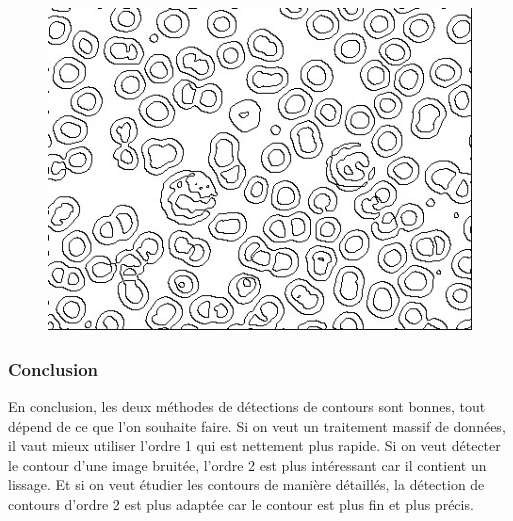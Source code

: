 \documentclass[paper=a4, fontsize=11pt]{scrartcl} %
\begin{document}
\begin{figure}
\includegraphics[scale=0.3]{images/rapport/blood2.jpg} 
\end{figure}

\subsubsection{Conclusion}
En conclusion, les deux méthodes de détections de contours sont bonnes, tout dépend de ce que l'on souhaite faire. Si on veut un traitement massif de données, il vaut mieux utiliser l'ordre 1 qui est nettement plus rapide. Si on veut détecter le contour d'une image bruitée, l'ordre 2 est plus intéressant car il contient un lissage. Et si on veut étudier les contours de manière détaillés, la détection de contours d'ordre 2 est plus adaptée car le contour est plus fin et plus précis.
\end{document}
